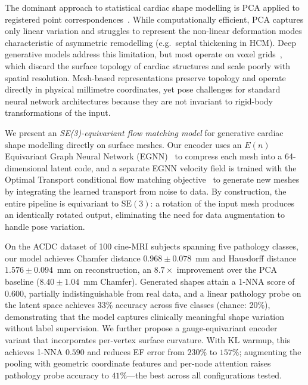 \documentclass{article}
\newcommand{\SE}{\mathrm{SE}(3)}
\begin{document}
The dominant approach to statistical cardiac shape modelling is PCA applied
to registered point correspondences~\cite{cootes1995active}.
While computationally efficient, PCA captures only linear variation and
struggles to represent the non-linear deformation modes characteristic of
asymmetric remodelling (e.g.\ septal thickening in HCM).
Deep generative models address this limitation, but most operate on
voxel grids~\cite{song2020score}, which discard the surface topology
of cardiac structures and scale poorly with spatial resolution.
Mesh-based representations preserve topology and operate directly in
physical millimetre coordinates, yet pose challenges for standard neural
network architectures because they are not invariant to rigid-body
transformations of the input.

We present an \emph{SE(3)-equivariant flow matching model} for generative
cardiac shape modelling directly on surface meshes.
Our encoder uses an $E(n)$ Equivariant Graph Neural Network
(EGNN)~\cite{satorras2021n} to compress each mesh into a 64-dimensional
latent code, and a separate EGNN velocity field is trained with the
Optimal Transport conditional flow matching objective~\cite{lipman2022flow}
to generate new meshes by integrating the learned transport from noise to
data.
By construction, the entire pipeline is equivariant to $\SE$: a rotation
of the input mesh produces an identically rotated output, eliminating the
need for data augmentation to handle pose variation.

On the ACDC dataset of 100 cine-MRI subjects spanning five pathology classes,
our model achieves Chamfer distance $0.968 \pm 0.078$~mm and Hausdorff
distance $1.576 \pm 0.094$~mm on reconstruction, an $8.7\times$ improvement
over the PCA baseline ($8.40 \pm 1.04$~mm Chamfer).
Generated shapes attain a 1-NNA score of 0.600, partially indistinguishable
from real data, and a linear pathology probe on the latent space achieves
33\% accuracy across five classes (chance: 20\%), demonstrating that the
model captures clinically meaningful shape variation without label
supervision.
We further propose a gauge-equivariant encoder variant that incorporates
per-vertex surface curvature.
With KL warmup, this achieves 1-NNA $0.590$ and reduces EF error from
$230\%$ to $157\%$; augmenting the pooling with geometric coordinate
features and per-node attention raises pathology probe accuracy to
$41\%$---the best across all configurations tested.

\end{document}
